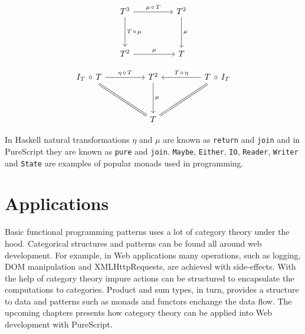 \documentclass[article]{aaltoseries}
\begin{document}
    \begin{equation}
      \label{associativity}
      \begin{tikzcd}[row sep=huge, column sep=huge]
        T^3 \arrow[r, "\mu\, \circ\, T"]
        \arrow[d, "T\, \circ\, \mu"]
        & T^2 \arrow[d, "\mu"] \\
        T^2 \arrow[r, "\mu"]
        & T
      \end{tikzcd}
    \end{equation}

    \begin{equation}
      \label{identity}
      \begin{tikzcd}[row sep=huge, column sep=huge]
        I_T\, \circ\, T
        \arrow[r, "\eta\, \circ\, T"]
        \arrow[dr, equal]
        & T^2
        \arrow[d, "\mu"]
        & T\, \circ\, I_T
        \arrow[l, "T\, \circ\, \eta"{above}]
        \arrow[dl, equal] \\
        {}
        & T
        &
      \end{tikzcd}
    \end{equation}

    In Haskell natural transformations $\eta$ and $\mu$ are known as
    \lstinline|return| and \lstinline|join| and in PureScript they are known as
    \lstinline|pure| and \lstinline|join|. \lstinline|Maybe|,
    \lstinline|Either|, \lstinline|IO|, \lstinline|Reader|, \lstinline|Writer|
    and \lstinline|State| are examples of popular monads used in programming.



\section{Applications}

Basic functional programming patterns uses a lot of category theory under the
hood. Categorical structures and patterns can be found all around web
development. For example, in Web applications many operations, such as logging,
DOM manipulation and XMLHttpRequests, are achieved with side-effects. With the
help of category theory impure actions can be structured to encapsulate the
computations to categories. Product and sum types, in turn, provides a structure
to data and patterns such as monads and functors enchange the data flow. The
upcoming chapters presents how category theory can be applied into Web
development with PureScript.

\end{document}
